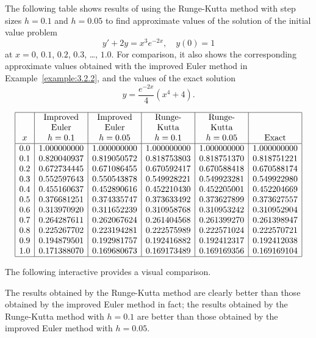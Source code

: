 \documentclass{ximera}
\begin{document}
\begin{example}\label{example:3.3.2}
The following table shows results of using the Runge-Kutta method
with step sizes $h=0.1$ and $h=0.05$ to find approximate values of
the solution of the initial value problem
$$
y'+2y=x^3e^{-2x},\quad y(0)=1
$$
at $x=0$, $0.1$, $0.2$, $0.3$, \dots, $1.0$. For comparison, it also shows
the
corresponding approximate values obtained with the improved Euler
method in Example~\ref{example:3.2.2}, and the values of the exact
solution
$$
y=\frac{e^{-2x}}{4}(x^4+4).
$$

$$
\begin{array}{|c|c|c|c|c|c|}
\hline
 & \text{Improved} & \text{Improved} & \text{Runge-} & \text{Runge-}& \\
 & \text{Euler} &\text{Euler} &\text{Kutta} & \text{Kutta}& \\
x&
h=0.1&
h=0.05&
h=0.1&
h=0.05&
\text{Exact}\\ \hline
0.0 & 1.000000000   &1.000000000 &1.000000000 & 1.000000000& 1.000000000 \\
0.1 & 0.820040937   &0.819050572 &0.818753803 & 0.818751370& 0.818751221 \\
0.2 & 0.672734445   &0.671086455 &0.670592417 & 0.670588418& 0.670588174 \\
0.3 & 0.552597643   &0.550543878 &0.549928221 & 0.549923281& 0.549922980 \\
0.4 & 0.455160637   &0.452890616 &0.452210430 & 0.452205001& 0.452204669 \\
0.5 & 0.376681251   &0.374335747 &0.373633492 & 0.373627899& 0.373627557 \\
0.6 & 0.313970920   &0.311652239 &0.310958768 & 0.310953242& 0.310952904 \\
0.7 & 0.264287611   &0.262067624 &0.261404568 & 0.261399270& 0.261398947 \\
0.8 & 0.225267702   &0.223194281 &0.222575989 & 0.222571024& 0.222570721 \\
0.9 & 0.194879501   &0.192981757 &0.192416882 & 0.192412317& 0.192412038 \\
1.0 & 0.171388070   &0.169680673 &0.169173489 & 0.169169356& 0.169169104\\
\hline
\end{array}
$$

The following interactive provides a visual comparison.

\begin{center}
\end{center}

The results obtained by the Runge-Kutta method are clearly better
than those obtained by the improved Euler method   in fact; the results
obtained by the Runge-Kutta method with $h=0.1$ are better than those
obtained by the improved Euler method with $h=0.05$.
\end{example}
\end{document}
